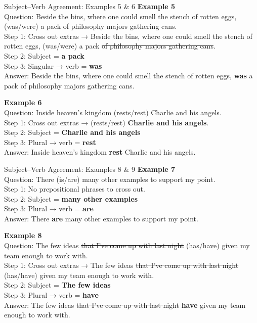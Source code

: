 \documentclass[aspectratio=169,11pt]{beamer}
\begin{document}
\begin{frame}{Subject–Verb Agreement: Examples 5 \& 6}
\small
\textbf{Example 5} \\
Question: Beside the bins, where one could smell the stench of rotten eggs, (was/were) a pack of philosophy majors gathering cans. \\
Step 1: Cross out extras →  Beside the bins, where one could smell the stench of rotten eggs, (was/were) a pack \sout{of philosophy majors gathering cans}. \\
Step 2: Subject = \textbf{a pack} \\
Step 3: Singular → verb = \textbf{was} \\
Answer: Beside the bins, where one could smell the stench of rotten eggs, \textbf{was} a pack of philosophy majors gathering cans.  

\vspace{0.8em}
\textbf{Example 6} \\
Question: Inside heaven’s kingdom (rests/rest) Charlie and his angels. \\
Step 1: Cross out extras → (rests/rest) \textbf{Charlie and his angels}. \\
Step 2: Subject = \textbf{Charlie and his angels} \\
Step 3: Plural → verb = \textbf{rest} \\
Answer: Inside heaven’s kingdom \textbf{rest} Charlie and his angels.
\end{frame}

\begin{frame}{Subject–Verb Agreement: Examples 8 \& 9}
\small
\textbf{Example 7} \\
Question: There (is/are) many other examples to support my point. \\
Step 1: No prepositional phrases to cross out. \\
Step 2: Subject = \textbf{many other examples} \\
Step 3: Plural → verb = \textbf{are} \\
Answer: There \textbf{are} many other examples to support my point.

\textbf{Example 8} \\
Question: The few ideas \sout{that I’ve come up with last night} (has/have) given my team enough to work with. \\
Step 1: Cross out extras → The few ideas \sout{that I’ve come up with last night} (has/have) given my team enough to work with. \\
Step 2: Subject = \textbf{The few ideas} \\
Step 3: Plural → verb = \textbf{have} \\
Answer: The few ideas \sout{that I’ve come up with last night} \textbf{have} given my team enough to work with.


\end{frame}
\end{document}
